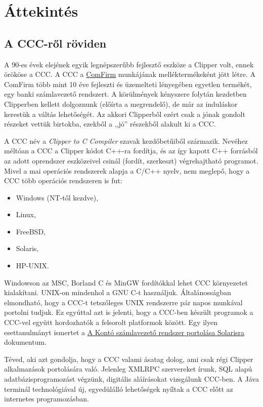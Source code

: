 \raggedright


\section{Áttekintés} 

\subsection{A CCC-ről röviden}

A 90-es évek elejének egyik legnépszerűbb fejlesztő eszköze
a Clipper volt, ennek örököse a CCC.
A CCC a \href{http://www.comfirm.hu}{ComFirm} munkájának melléktermékeként
jött létre. A ComFirm több mint 10 éve fejleszti és üzemelteti
lényegében egyetlen termékét, egy banki számlavezető rendszert.
A körülmények kényszere folytán kezdetben Clipperben kellett
dolgoznunk (előírta a megrendelő), de már az induláskor kerestük 
a váltás lehetőségét. Az akkori Clipperből ezért csak a jónak gondolt 
részeket vettük birtokba, ezekből a ,,jó'' részekből alakult ki a CCC.

A CCC név a {\em Clipper to C Compiler\/} szavak kezdőbetűiből származik.
Nevéhez méltóan a CCC a Clipper kódot C++-ra fordítja,
és az így kapott C++ forrásból az adott oprendszer eszközeivel 
csinál (fordít, szerkeszt) végrehajtható programot.
Mivel a mai operációs rendszerek alapja a C/C++ nyelv, 
nem meglepő, hogy a CCC  több operációs rendszeren is fut:

\begin{itemize}
\item Windows (NT-től kezdve),
\item Linux,
\item FreeBSD,
\item Solaris,
\item HP-UNIX.
\end{itemize}

Windowson az MSC, Borland C és MinGW  fordítókkal lehet
CCC környezetet kialakítani. UNIX-on mindenhol a GNU C-t használjuk.
Általánosságban elmondható, hogy a CCC-t tetszőleges UNIX rendszerre 
pár napos munkával portolni tudjuk. Ez egyúttal azt is jelenti,
hogy a CCC-ben készült programok a CCC-vel együtt hordozhatók 
a felsorolt platformok között. Egy ilyen esettanulmányt ismertet a
\href{solarisport.html}{A Kontó számlavezető rendszer portolása Solarisra} 
dokumentum.
 
Téved, aki azt gondolja, hogy a CCC valami ásatag dolog,
ami csak régi Clipper alkalmazások portolására való.
Jelenleg XMLRPC szervereket írunk, SQL alapú adatbázisprogramozást
végzünk, digitális aláírásokat vizsgálunk CCC-ben. 
A Jáva terminál technológiával  új, egyedülálló lehetőségek nyíltak  
a CCC előtt az internetes programozásban.

